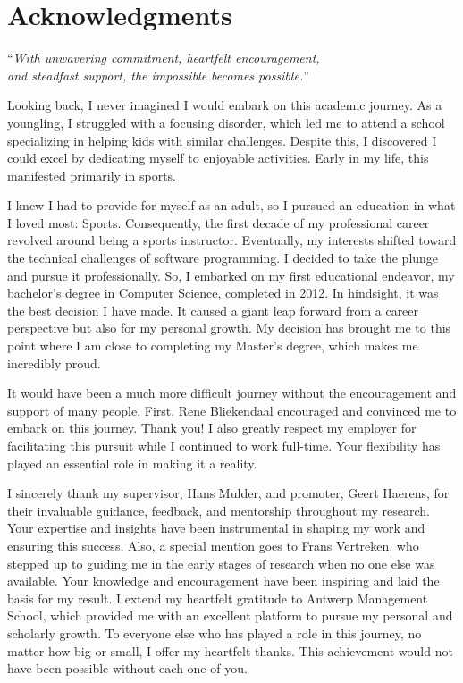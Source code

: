 \chapter*{Acknowledgments}
\small

\begin{center}
\enquote{\textit{With unwavering commitment, heartfelt encouragement, \\and steadfast support, the
impossible becomes possible.}}
\end{center}
Looking back, I never imagined I would embark on this academic journey. As a youngling, I
struggled with a focusing disorder, which led me to attend a school specializing in
helping kids with similar challenges. Despite this, I discovered I could excel by
dedicating myself to enjoyable activities. Early in my life, this manifested primarily in
sports.

I knew I had to provide for myself as an adult, so I pursued an education in what I loved
most: Sports. Consequently, the first decade of my professional career revolved around
being a sports instructor. Eventually, my interests shifted toward the technical
challenges of software programming. I decided to take the plunge and pursue it
professionally. So, I embarked on my first educational endeavor, my bachelor's degree in
Computer Science, completed in 2012. In hindsight, it was the best decision I have made.
It caused a giant leap forward from a career perspective but also for my personal growth.
My decision has brought me to this point where I am close to completing my Master's
degree, which makes me incredibly proud. 

It would have been a much more difficult journey without the encouragement and support of
many people. First, Rene Bliekendaal encouraged and convinced me to embark on this
journey. Thank you! I also greatly respect my employer for facilitating this pursuit while
I continued to work full-time. Your flexibility has played an essential role in making it
a reality.

I sincerely thank my supervisor, Hans Mulder, and promoter, Geert Haerens, for their
invaluable guidance, feedback, and mentorship throughout my research. Your expertise and
insights have been instrumental in shaping my work and ensuring this success. Also, a
special mention goes to Frans Vertreken, who stepped up to guiding me in the early stages
of research when no one else was available. Your knowledge and encouragement have been
inspiring and laid the basis for my result. I extend my heartfelt gratitude to Antwerp
Management School, which provided me with an excellent platform to pursue my personal and
scholarly growth. To everyone else who has played a role in this journey, no matter how
big or small, I offer my heartfelt thanks. This achievement would not have been possible
without each one of you.

